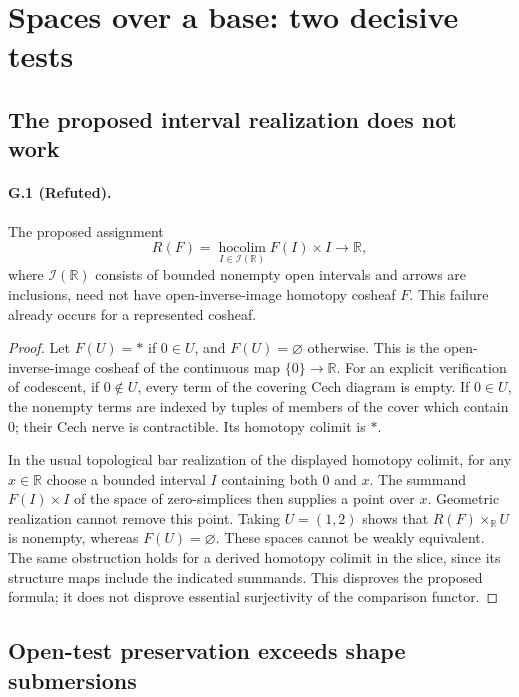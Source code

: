 \section{Spaces over a base: two decisive tests}

\subsection{The proposed interval realization does not work}
\paragraph{G.1 (Refuted).}
The proposed assignment
\[
 R(F)=\operatorname*{hocolim}_{I\in\mathcal I(\mathbb R)}F(I)\times I
       \longrightarrow\mathbb R,
\]
where $\mathcal I(\mathbb R)$ consists of bounded nonempty open intervals
and arrows are inclusions, need not have open-inverse-image homotopy
cosheaf $F$.  This failure already occurs for a represented cosheaf.
\begin{proof}
Let $F(U)=*$ if $0\in U$, and $F(U)=\varnothing$ otherwise. This is
the open-inverse-image cosheaf of the continuous map $\{0\}\to\mathbb R$.
For an explicit verification of codescent, if $0\notin U$, every term
of the covering Cech diagram is empty. If $0\in U$, the nonempty terms
are indexed by tuples of members of the cover which contain $0$;
their Cech nerve is contractible. Its homotopy colimit is $*$.

In the usual topological bar realization of the displayed homotopy
colimit, for any $x\in\mathbb R$ choose a bounded interval $I$
containing both $0$ and $x$. The summand $F(I)\times I$ of the
space of zero-simplices then supplies a point over $x$. Geometric
realization cannot remove this point. Taking $U=(1,2)$ shows that
$R(F)\times_{\mathbb R}U$ is nonempty, whereas $F(U)=\varnothing$.
These spaces cannot be weakly equivalent. The same obstruction holds
for a derived homotopy colimit in the slice, since its structure maps
include the indicated summands. This disproves the proposed formula;
it does not disprove essential surjectivity of the comparison functor.
\end{proof}


\subsection{Open-test preservation exceeds shape submersions}
